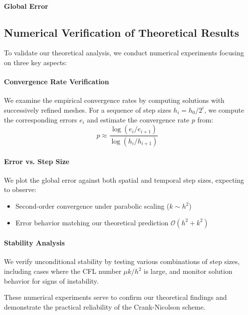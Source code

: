 \paragraph{Global Error}

\subsection{Numerical Verification of Theoretical Results}

To validate our theoretical analysis, we conduct numerical experiments focusing on three key aspects:

\paragraph{Convergence Rate Verification}
We examine the empirical convergence rates by computing solutions with successively refined meshes. For a sequence of step sizes $h_i = h_0/2^i$, we compute the corresponding errors $e_i$ and estimate the convergence rate $p$ from:
\[
  p \approx \frac{\log(e_i/e_{i+1})}{\log(h_i/h_{i+1})}
\]

\paragraph{Error vs. Step Size}
We plot the global error against both spatial and temporal step sizes, expecting to observe:
\begin{itemize}
  \item Second-order convergence under parabolic scaling ($k \sim h^2$)
  \item Error behavior matching our theoretical prediction $\mathcal{O}(h^2 + k^2)$
\end{itemize}




\paragraph{Stability Analysis}
We verify unconditional stability by testing various combinations of step sizes, including cases where the CFL number $\mu k/h^2$ is large, and monitor solution behavior for signs of instability.

These numerical experiments serve to confirm our theoretical findings and demonstrate the practical reliability of the Crank-Nicolson scheme.


